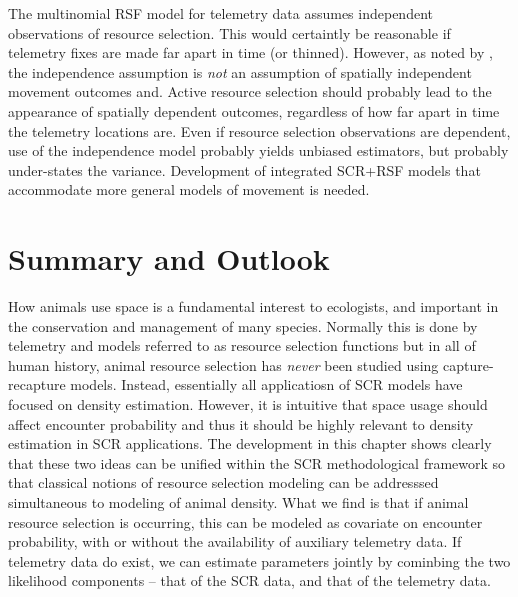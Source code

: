 The multinomial RSF model for telemetry data assumes 
independent observations of resource selection.  This would certaintly
be reasonable if telemetry fixes are made far apart in time (or thinned).
However, as noted by \citet{royle_etal:2012}, the independence assumption
is {\it not} an assumption of spatially independent movement outcomes
and. 
Active resource selection should probably lead to the appearance of
spatially dependent outcomes, 
 regardless of how far apart in time the telemetry
locations are.  Even if resource selection observations are dependent,
use of the independence model probably yields unbiased estimators, but
probably under-states the variance. 
Development of integrated SCR+RSF models that 
accommodate more general models of movement is needed. 




\section{Summary and Outlook}


How animals use space is a fundamental interest to ecologists, and
important in the conservation and management of many species.
Normally this is done by telemetry and models referred to as resource
selection functions \citep{manly_etal:2002} but in all of human
history, animal resource selection has {\it never} been studied using
capture-recapture models. Instead, essentially all applicatiosn of SCR
models have focused on density estimation.  However, it is intuitive
that space usage should affect encounter probability and thus it
should be highly relevant to density estimation in SCR
applications. The development in this chapter shows clearly that these
two ideas can be unified within the SCR methodological framework so
that classical notions of resource selection modeling can be
addresssed simultaneous to modeling of animal density. What we find is
that if animal resource selection is occurring, this can be modeled as
covariate on encounter probability, with or without the availability
of auxiliary telemetry data. If telemetry data do exist, we can
estimate parameters jointly by cominbing the two likelihood components
-- that of the SCR data, and that of the telemetry data.



